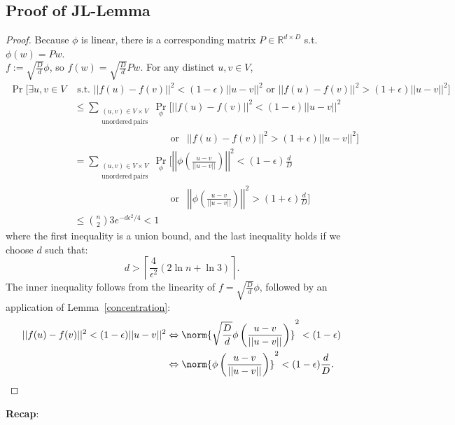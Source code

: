 \subsection{Proof of JL-Lemma}
\begin{proof}
Because $\phi$ is linear, there is a corresponding matrix $P\in
\mathbb{R}^{d\times D}$ s.t. $\phi(w)=Pw$. \\ 
$f:=\sqrt{\frac{D}{d}} \phi$, so $f(w) = \sqrt{\frac{D}{d}} Pw$. For
any distinct $u,v\in V$,\\ 
\begin{align*}
\Pr\bigg[\exists u,v \in V &\textrm{ s.t. } ||f(u)-f(v)||^2 <
  (1-\epsilon)||u-v||^2\textrm{ or } ||f(u)-f(v)||^2 >
  (1+\epsilon)||u-v||^2\bigg]\\ 
&\leq \sum_{\substack{(u,v)\in V\times V\\
    \mathrm{unordered~pairs}}} \Pr_\phi \Big[||f(u)-f(v)||^2 <
  (1-\epsilon)||u-v||^2\\  
&\hspace{4cm}\textrm{ or } \ \ ||f(u)-f(v)||^2 >
  (1+\epsilon)||u-v||^2\Big]\\ 
& = \sum_{\substack{(u,v)\in V\times V\\
                  \mathrm{unordered~pairs}}} \Pr_\phi
\bigg[\left|\left|\phi
  \left(\frac{u-v}{||u-v||}\right)\right|\right|^2 <
  (1-\epsilon)\frac{d}{D}\\ 
&\hspace{4cm}\textrm{ or }\ \ \left|\left|\phi
  \left(\frac{u-v}{||u-v||}\right)\right|\right|^2 >
  (1+\epsilon)\frac{d}{D}\bigg]\\ 
&\leq \binom{n}{2} 3 e^{-d\epsilon^2/4} < 1
\end{align*}
where the first inequality is a union bound, and the last inequality
holds if we choose $d$ such that: 
\[d > \left\lceil\frac{4}{\epsilon^2} (2\ln n + \ln 3)\right\rceil.\]
The inner inequality follows from the linearity of $f =
\sqrt{\frac{D}{d}} \phi$, followed by an application of
Lemma~\ref{concentration}: 
\begin{align*}
||f(u)-f(v)||^2 < (1-\epsilon)||u-v||^2
&\Leftrightarrow \norm{\sqrt{\frac{D}{d}}
  \phi\left(\frac{u-v}{||u-v||}\right)}^2 < (1-\epsilon)\\ 
&\Leftrightarrow \norm{\phi\left(\frac{u-v}{||u-v||}\right)}^2 <
(1-\epsilon)\frac{d}{D}. 
\end{align*}
\end{proof}

\noindent\textbf{Recap}: 

